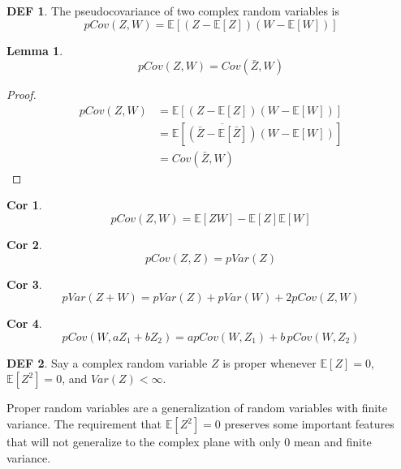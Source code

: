 \documentclass{article}
\theoremstyle{definition}\newtheorem{definition}{DEF}
\theoremstyle{lemma}\newtheorem{lemma}{Lemma}
\theoremstyle{corrolary}\newtheorem{corrolary}{Cor}
\begin{document}
\begin{definition}
The pseudocovariance of two complex random variables is
\begin{equation}
pCov(Z,W)=\mathbb{E}[(Z-\mathbb{E}[Z])(W-\mathbb{E}[W])]
\end{equation}
\end{definition}

\begin{lemma}
\begin{equation}
pCov(Z,W) = Cov(\bar{Z},W)
\end{equation}
\end{lemma}
\begin{proof}
\begin{align*}
pCov(Z,W)
&= \mathbb{E}[(Z -\mathbb{E}[Z])(W - \mathbb{E}[W])]\\
&= \mathbb{E}[\overline{(\bar{Z} - \mathbb{E}[\bar{Z}])}(W - \mathbb{E}[W])] \\
&= Cov(\bar{Z}, W)
\end{align*}
\end{proof}
\begin{corrolary}
\begin{equation}
pCov(Z,W) = \mathbb{E}[ZW] - \mathbb{E}[Z]\mathbb{E}[W]
\end{equation}
\end{corrolary}
\begin{corrolary}
\begin{equation}
pCov(Z, Z) = pVar(Z)
\end{equation}
\end{corrolary}
\begin{corrolary}
\begin{equation}
pVar(Z+W) = pVar(Z) + pVar(W) + 2pCov(Z,W)
\end{equation}
\end{corrolary}
\begin{corrolary}
\begin{equation}
pCov(W, aZ_1 + bZ_2) = apCov(W,Z_1) + b\, pCov(W,Z_2)
\end{equation}
\end{corrolary}

\begin{definition}
Say a complex random variable $Z$ is proper whenever $\mathbb{E}[Z]=0$, $\mathbb{E}[Z^2]=0$, and $Var(Z)<\infty$.
\end{definition}

Proper random variables are a generalization of random variables with finite variance.
The requirement that $\mathbb{E}[Z^2]=0$ preserves some important features that will not generalize to the complex plane with only 0 mean and finite variance.
\end{document}
